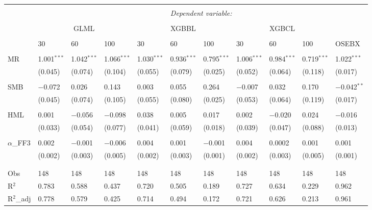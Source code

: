 \begin{table}[H] \centering  
\footnotesize
\begin{tabularx}{\textwidth}{XXXX|XXX|XXX|l} 
\\[-2ex]\hline 
\hline \\[-2ex] 
 & \multicolumn{10}{c}{\textit{Dependent variable:}} \\ 
\cline{2-11} 
\\[-2ex] 
 & \multicolumn{3}{c}{GLML} & \multicolumn{3}{c}{XGBBL} & \multicolumn{3}{c}{XGBCL} & \\
 \cline{2-10}
 \\[-2ex] 
 & 30 & 60 & 100 & 30 & 60 & 100 & 30 & 60 & 100 & OSEBX \\ 
 \cline{2-10} \\
 MR & 1.001$^{***}$ & 1.042$^{***}$ & 1.066$^{***}$ & 1.030$^{***}$ & 0.936$^{***}$ & 0.795$^{***}$ & 1.006$^{***}$ & 0.984$^{***}$ & 0.719$^{***}$ & 1.022$^{***}$ \\ 
  & (0.045) & (0.074) & (0.104) & (0.055) & (0.079) & (0.025) & (0.052) & (0.064) & (0.118) & (0.017) \\ 
   & & & & & & & & & & \\ 
 SMB & $-$0.072 & 0.026 & 0.143 & 0.003 & 0.055 & 0.264 & $-$0.007 & 0.032 & 0.170 & $-$0.042$^{**}$ \\ 
  & (0.045) & (0.074) & (0.105) & (0.055) & (0.080) & (0.025) & (0.053) & (0.064) & (0.119) & (0.017) \\ 
   & & & & & & & & & & \\ 
 HML & 0.001 & $-$0.056 & $-$0.098 & 0.038 & 0.005 & 0.017 & 0.002 & $-$0.020 & 0.024 & $-$0.016 \\ 
  & (0.033) & (0.054) & (0.077) & (0.041) & (0.059) & (0.018) & (0.039) & (0.047) & (0.088) & (0.013) \\ 
   & & & & & & & & & & \\ 
 $\alpha$_{FF3} & 0.002 & $-$0.001 & $-$0.006 & 0.004 & 0.001 & $-$0.001 & 0.004 & 0.0002 & 0.001 & 0.001 \\ 
  & (0.002) & (0.003) & (0.005) & (0.002) & (0.003) & (0.001) & (0.002) & (0.003) & (0.005) & (0.001) \\ 
   & & & & & & & & & & \\ 
\hline \\[-2ex] 
Obs & 148 & 148 & 148 & 148 & 148 & 148 & 148 & 148 & 148 & 148 \\ 
R$^{2}$ & 0.783 & 0.588 & 0.437 & 0.720 & 0.505 & 0.189 & 0.727 & 0.634 & 0.229 & 0.962 \\ 
R$^{2}$_{adj} & 0.778 & 0.579 & 0.425 & 0.714 & 0.494 & 0.172 & 0.721 & 0.626 & 0.213 & 0.961 \\ 


\end{tabularx}
\end{table}
